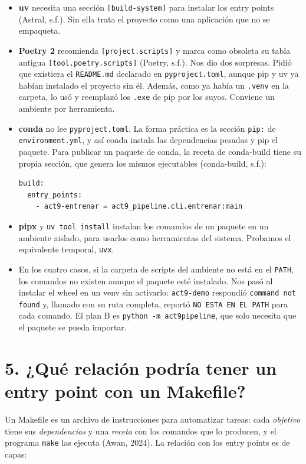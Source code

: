 \documentclass[12pt,a4paper]{article}
\renewcommand{\_}{\guionbajo\allowbreak}
\begin{document}
\begin{itemize}[leftmargin=1.4em]
\item \textbf{uv} necesita una sección \texttt{[build-system]} para instalar los entry points
(Astral, s.f.). Sin ella trata el proyecto como una aplicación que no se empaqueta.
\item \textbf{Poetry 2} recomienda \texttt{[project.scripts]} y marca como obsoleta su tabla
antigua \texttt{[tool.poetry.scripts]} (Poetry, s.f.). Nos dio dos sorpresas. Pidió que existiera
el \texttt{README.md} declarado en \texttt{pyproject.toml}, aunque pip y uv ya habían instalado el
proyecto sin él. Además,
como ya había un \texttt{.venv} en la carpeta, lo usó y reemplazó los \texttt{.exe} de pip por los
suyos. Conviene un ambiente por herramienta.
\item \textbf{conda} no lee \texttt{pyproject.toml}. La forma práctica es la sección \texttt{pip:} de
\texttt{environment.yml}, y así conda instala las dependencias pesadas y pip el paquete. Para
publicar un paquete de conda, la receta de conda-build tiene su propia sección, que genera los
mismos ejecutables (conda-build, s.f.):
\begin{verbatim}
build:
  entry_points:
    - act9-entrenar = act9_pipeline.cli.entrenar:main
\end{verbatim}
\item \textbf{pipx} y \texttt{uv tool install} instalan los comandos de un paquete en un ambiente
aislado, para usarlos como herramientas del sistema. Probamos el equivalente temporal,
\texttt{uvx}.
\item En los cuatro casos, si la carpeta de scripts del ambiente no está en el \texttt{PATH}, los
comandos no existen aunque el paquete esté instalado. Nos pasó al instalar el wheel en un venv sin
activarlo: \texttt{act9-demo} respondió \texttt{command not found} y, llamado con su ruta completa,
reportó \texttt{NO ESTA EN EL PATH} para cada comando. El plan B es \texttt{python -m act9\_pipeline},
que solo necesita que el paquete se pueda importar.
\end{itemize}

\section{5. ¿Qué relación podría tener un entry point con un Makefile?}

Un Makefile es un archivo de instrucciones para automatizar tareas: cada \emph{objetivo} tiene sus
\emph{dependencias} y una \emph{receta} con los comandos que lo producen, y el programa
\texttt{make} las ejecuta (Awan, 2024). La relación con los entry points es de capas:
\end{document}
